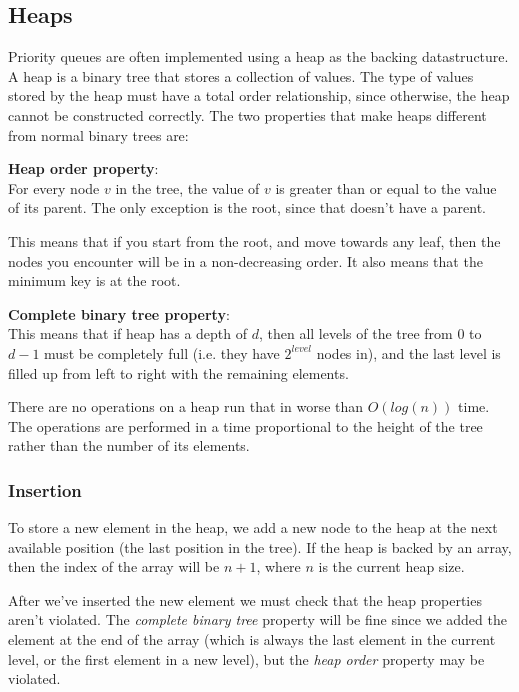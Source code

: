 \subsection{Heaps}

Priority queues are often implemented using a heap as the backing datastructure.
A heap is a binary tree that stores a collection of values. The type of values
stored by the heap must have a total order relationship, since otherwise, the
heap cannot be constructed correctly. The two properties that make heaps
different from normal binary trees are:

\begin{description}
  \item \textbf{Heap order property}:\\
    For every node $v$ in the tree, the value of $v$ is greater than or equal to
    the value of its parent. The only exception is the root, since that doesn't 
    have a parent.

    This means that if you start from the root, and move towards any leaf, then
    the nodes you encounter will be in a non-decreasing order. It also means 
    that the minimum key is at the root.
  \item \textbf{Complete binary tree property}:\\
    This means that if heap has a depth of $d$, then all levels of the tree from
    $0$ to $d-1$ must be completely full (i.e. they have $2^{level}$ nodes in),
    and the last level is filled up from left to right with the remaining
    elements.
\end{description}

There are no operations on a heap run that in worse than $O(log(n))$ time. The
operations are performed in a time proportional to the height of the tree rather
than the number of its elements.

\subsubsection{Insertion}

To store a new element in the heap, we add a new node to the heap at the next
available position (the last position in the tree). If the heap is backed by an
array, then the index of the array will be $n+1$, where $n$ is the current heap
size.

After we've inserted the new element we must check that the heap properties
aren't violated. The \textit{complete binary tree} property will be fine since
we added the element at the end of the array (which is always the last element
in the current level, or the first element in a new level), but the \textit{heap
order} property may be violated.


